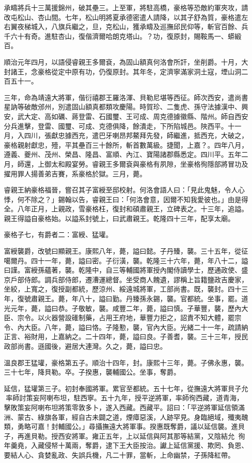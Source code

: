 \begin{pinyinscope}
承疇將兵十三萬援錦州，破其壘三。上至軍，將駐高橋，豪格等恐敵約軍夾攻，請改屯松山、杏山間。七年，松山明將夏承德密遣人請降，以其子舒為質，豪格遣左右翼夜梯城入，八旗兵繼之，旦，克松山，獲承疇及巡撫邱民仰等，斬官百餘、兵千六十有奇。進駐杏山，復偕濟爾哈朗克塔山。？功，復原封，賜鞍馬一、蟒緞百。

順治元年四月，以語侵睿親王多爾袞，為固山額真何洛會所訐，坐削爵。十月，大封諸王，念豪格從定中原有功，仍復原封。其年冬，定濟寧滿家洞土寇，堙山洞二百五十一。

三年，命為靖遠大將軍，偕衍禧郡王羅洛渾、貝勒尼堪等西征。師次西安，遣尚書星訥等破敵邠州，別遣固山額真都類攻慶陽。時賀珍、二隻虎、孫守法據漢中、興安，武大定、高如礪、蔣登雷、石國璽、王可成、周克德據徽縣、階州。師自西安分兵進擊，登雷、國璽、可成、克德俱降，餘潰走，下所陷城邑。陜西平。十一月，入四川，張獻忠據西充，遣巴牙喇昂邦鰲拜先發，師繼進，抵西充，大破之，豪格親射獻忠，殪，平其壘百三十餘所，斬首數萬級。捷聞，上嘉？。四年八月，遵義、夔州、茂州、榮昌、隆昌、富順、內江、寶陽諸郡縣悉定。四川平。五年二月，師還，上御太和殿宴勞。睿親王多爾袞與豪格有夙隙，坐豪格徇隱部將冒功及擢用罪人揚善弟吉賽，系豪格於獄。三月，薨。

睿親王納豪格福晉，嘗召其子富綬至邸校射。何洛會語人曰：「見此鬼魅，令人心悸，何不除之？」錫翰以告，睿親王曰：「何洛會意，因爾不知我愛彼也。」由是得全。八年正月，上親政，雪豪格枉，復封和碩肅親王，立碑表之。十三年，追謚。親王得謚自豪格始。以謚系封號上，曰武肅親王。乾隆四十三年，配享太廟。

豪格子七，有爵者二：富綬、猛瓘。

富綬襲爵，改號曰顯親王。康熙八年，薨，謚曰懿。子丹臻，襲。三十五年，從征噶爾丹。四十一年，薨，謚曰密。子衍潢，襲。乾隆三十六年，薨，年八十二，謚曰謹。富綬孫蘊著，襲。乾隆中，自三等輔國將軍授內閣侍讀學士，歷通政使、盛京戶部侍郎。調兵部侍郎，遷漕運總督。坐受商人餽遺，謬稱上旨籍鹽政吉慶家，坐絞，上寬之，復授副都統，歷涼州、綏遠城將軍，工部尚書。既，襲封。四十三年，復號肅親王。薨，年八十，謚曰勤。丹臻孫永錫，襲。官都統。坐事，罷。道光元年，薨，謚曰恭。子敬敏，襲。咸豐二年，薨，謚曰慎。子華豐，襲，歷內大臣、宗令。以火器營設碓制藥，占用王府地，華豐力拒之，詔責不知大體，罷宗令、內大臣。八年，薨，謚曰恪。子隆懃，襲，官內大臣。光緒二十一年，疏請納正言、裕財用，上嘉納之。二十四年，薨，謚曰良。子善耆，襲。三十三年，授民政部尚書。遜國後，避居大連灣。久之，薨，謚曰忠。

溫良郡王猛瓘，豪格第五子。順治十四年，封。康熙十三年，薨。子佛永惠，襲。三十七年，降貝勒。卒。子揆惠，襲輔國公。坐事，奪爵。

延信，猛瓘第三子。初封奉國將軍。累官至都統。五十七年，從撫遠大將軍貝子允率師討策妄阿喇布坦，駐西寧。五十九年，授平逆將軍，率師徇西藏，道青海，擊敗策妄阿喇布坦將策零敦多卜，遂入西藏。西藏平。詔曰：「平逆將軍延信領滿洲、蒙古、綠旗各軍，經自古未闢之道，煙瘴惡溪，人跡罕見。身臨絕域，殲夷醜類，勇略可嘉！封輔國公。」尋攝撫遠大將軍事。揆惠既奪爵，議以延信襲。進貝子，再進貝勒。授西安將軍。雍正五年，上以延信與阿其那等結黨，又陰結允，徇年羹堯，入藏侵帑十萬兩，奪爵，逮下王大臣按治。讞上延信黨援、欺罔、負恩、要結人心、貪婪亂政、失誤兵機，凡二十罪，當斬，上命幽禁，子孫降紅帶。


\end{pinyinscope}
